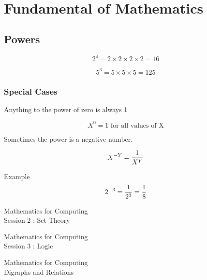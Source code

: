 \documentclass[a4paper,12pt]{article}
\begin{document}

\section{Fundamental of Mathematics}

\subsection{Powers}

\[  2^ 4 = 2 \times 2 \times 2 \times 2 = 16 \]

\[  5^ 3 = 5 \times 5 \times 5 =125 \]

\subsubsection{Special Cases}

Anything to the power of zero is always 1

\[  X^ 0 = 1 \mbox{ for all values of X} \]

Sometimes the power is a negative number.

\[  X^{-Y} = { 1 \over X^Y}  \]

Example 
\[  2^{-3} = { 1 \over 2^3} = { 1 \over 8}  \]


\newpage
\begin{center}
\huge{Mathematics for Computing}\\
{\LARGE Session 2 : Set Theory}
\end{center}



\newpage
\newpage
\begin{center}
\huge{Mathematics for Computing}\\
{\LARGE Session 3 : Logic}
\end{center}




\newpage
\begin{center}
\huge{Mathematics for Computing}\\
\LARGE{Digraphs and Relations}
\end{center}



\end{document}
